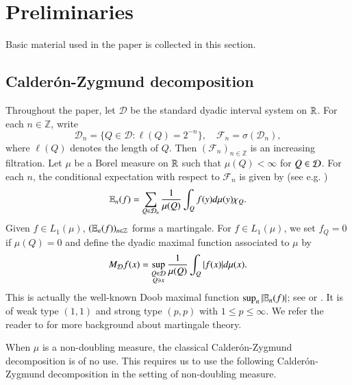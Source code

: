 \documentclass[leqno]{amsart}
\begin{document}
\section{Preliminaries}\label{sec-pre}
Basic material used in the paper is collected in this section.

\subsection{Calder\'{o}n-Zygmund decomposition}
Throughout the paper, let $\mathcal{D}$ be the standard dyadic interval system on ${\mathbb R}$. For each $n\in\mathbb{Z}$, write
$$\mathcal{D}_n=\{Q\in \mathcal{D}: \ell(Q)=2^{-n}\},\quad \mathcal{F}_n=\sigma(\mathcal{D}_n),$$
where $\ell(Q)$ denotes the length of $Q$. Then $(\mathcal{F}_n)_{n\in\mathbb{Z}}$ is an increasing filtration. 
Let $\mu$ be a Borel measure on ${\mathbb R}$ such that $\mu(Q)<\infty$ for $Q\in{\mathcal D}$.
For each $n$, the conditional expectation with respect to $\mathcal{F}_n$ is given by (see e.g. \cite[p.\,2]{Lo1993})
\begin{align}\label{expectation definition}
	\mathbb E_{n}(f)=\sum_{Q\in{\mathcal D}_{n}}\frac{1}{\mu(Q)}\int_{Q}f(y)d\mu(y)\chi_{Q}.
\end{align}
Given $f\in L_1(\mu)$, $(\mathbb E_n(f))_{n\in\mathbb{Z}}$ forms a martingale.  For $f\in L_{1}(\mu)$, we set $f_{Q}=0$ if $\mu(Q)=0$ and define the dyadic maximal function associated to $\mu$ by
$$M_{{\mathcal D}}f(x)=\sup_{\substack{Q\in{\mathcal D}\\Q\ni x}}\frac{1}{\mu(Q)}\int_{Q}|f(x)|d\mu(x).$$
This is actually the well-known Doob maximal function $\sup_n|\mathbb E_n(f)|$; see \cite{Pi2016} or \cite[p.\,33]{Lo1993}. It is of weak type $(1,1)$ and strong type $(p,p)$ with $1\leq p\leq \infty$. We refer the reader to \cite{Ga1973,HNVW2016,Lo1993,Pi2016,We1994} for more background about martingale theory.

When $\mu$ is a non-doubling measure, the classical Calder\'{o}n-Zygmund decomposition is of no use.
This requires us to use the following Calder\'{o}n-Zygmund decomposition in the setting of non-doubling measure.
\end{document}

